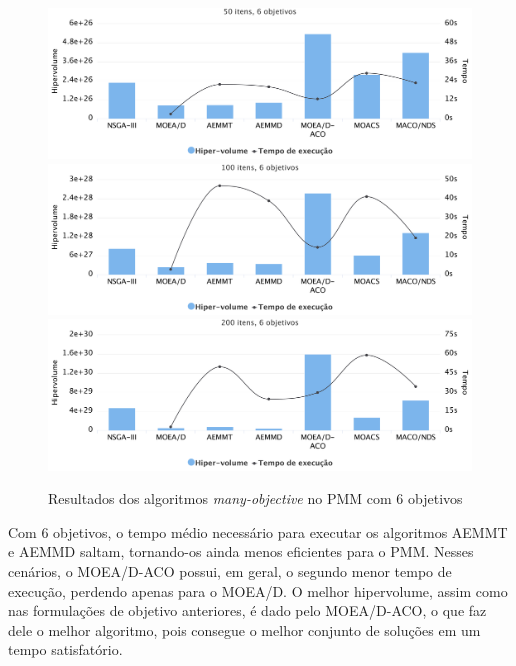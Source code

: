 \begin{figure}[!htbp]
	\includegraphics[width=1\textwidth]{cap_experimentos/figs/etapa4/i50o6}
	\includegraphics[width=1\textwidth]{cap_experimentos/figs/etapa4/i100o6}
	\includegraphics[width=1\textwidth]{cap_experimentos/figs/etapa4/i200o6}
	\caption{\label{fig_exp4_mkp_o6}Resultados dos algoritmos \textit{many-objective} no PMM com 6 objetivos}
\end{figure}

Com 6 objetivos, o tempo médio necessário para executar os algoritmos AEMMT e AEMMD saltam, tornando-os ainda menos eficientes para o PMM. Nesses cenários, o MOEA/D-ACO possui, em geral, o segundo menor tempo de execução, perdendo apenas para o MOEA/D. O melhor hipervolume, assim como nas formulações de objetivo anteriores, é dado pelo MOEA/D-ACO, o que faz dele o melhor algoritmo, pois consegue o melhor conjunto de soluções em um tempo satisfatório.

